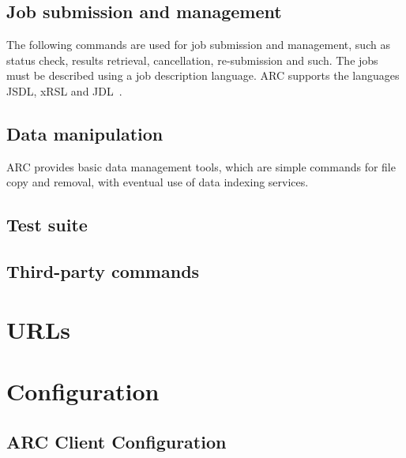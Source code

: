 \documentclass{book}
\begin{document}
\section{Job submission and management} \label{sec:ui} 
The following commands are used for job submission and management,
such as status check, results retrieval, cancellation, re-submission
and such. The jobs must be described using a job description language. ARC supports the languages JSDL, xRSL and JDL~\cite{xrsl}.



\section{Data manipulation} \label{sec:dm} 
 ARC provides basic data management tools,
which are simple commands for file copy and removal, with eventual use
of data indexing services.



\section{Test suite} \label{sec:testsuite}


\section{Third-party commands} \label{sec:ui-other}
%


\chapter{URLs}\label{sec:urls}
%

\chapter{Configuration} \label{sec:client.conf} 
\section{ARC Client Configuration}
%


\printindex
\end{document}
